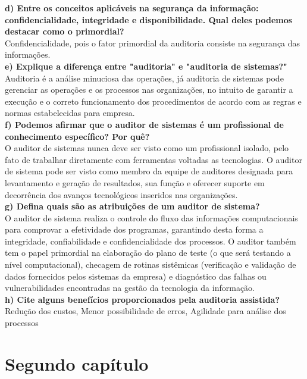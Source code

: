\documentclass[12pt]{article}
\begin{document}
\textbf{d) Entre os conceitos aplicáveis na segurança da informação: confidencialidade, integridade e disponibilidade. Qual deles podemos destacar como o primordial?}
\\
Confidencialidade, pois o fator primordial da auditoria consiste na segurança das informações.
\\

\textbf{e) Explique a diferença entre "auditoria" e "auditoria de sistemas?"}
\\
Auditoria é a análise minuciosa das operações, já auditoria de sistemas pode gerenciar as operações e os processos nas organizações, no intuito de garantir a execução e o correto funcionamento dos procedimentos de acordo com as regras e normas estabelecidas para empresa.
\\

\textbf{f) Podemos afirmar que o auditor de sistemas é um profissional de conhecimento específico? Por quê?}
\\
O auditor de sistemas nunca deve ser visto como um profissional isolado, pelo fato de trabalhar diretamente com ferramentas voltadas as tecnologias.  O auditor de sistema pode ser visto como membro da equipe de auditores designada para levantamento e geração de resultados, sua função e oferecer suporte em decorrência dos avanços tecnológicos inseridos nas organizações.
\\

\textbf{g) Defina quais são as atribuições de um auditor de sistema?}
\\
O auditor de sistema realiza o controle do fluxo das informações computacionais para comprovar a efetividade dos programas, garantindo desta forma a integridade, confiabilidade e confidencialidade dos processos.
O auditor também tem o papel primordial na elaboração do plano de teste (o que será testando a nível computacional), checagem de rotinas sistêmicas (verificação e validação de dados fornecidos pelos sistemas da empresa) e diagnóstico das falhas ou vulnerabilidades encontradas na gestão da tecnologia da informação. 
\\

\textbf{h) Cite alguns benefícios proporcionados pela auditoria assistida?}
\\
Redução dos custos, Menor possibilidade de erros, Agilidade para análise dos processos

\section{Segundo capítulo}
\end{document}
